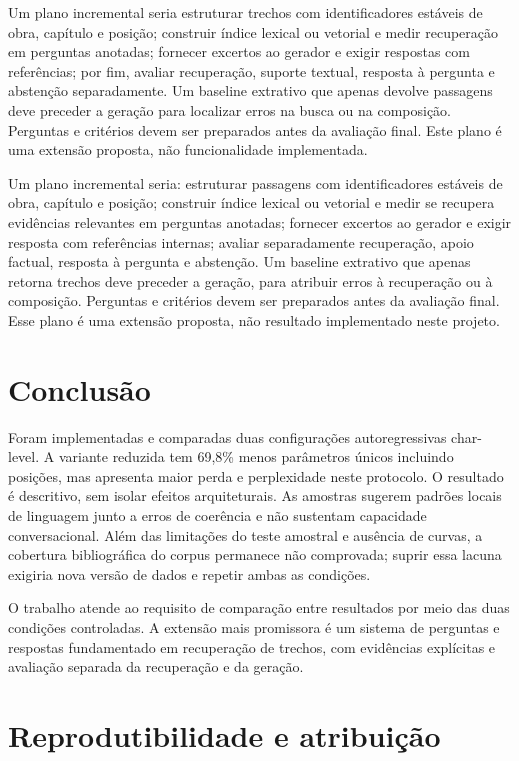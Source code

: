 \documentclass[conference]{IEEEtran}
\begin{document}
Um plano incremental seria estruturar trechos com identificadores estáveis de obra, capítulo e posição; construir índice lexical ou vetorial e medir recuperação em perguntas anotadas; fornecer excertos ao gerador e exigir respostas com referências; por fim, avaliar recuperação, suporte textual, resposta à pergunta e abstenção separadamente. Um baseline extrativo que apenas devolve passagens deve preceder a geração para localizar erros na busca ou na composição. Perguntas e critérios devem ser preparados antes da avaliação final. Este plano é uma extensão proposta, não funcionalidade implementada.

Um plano incremental seria: estruturar passagens com identificadores estáveis de obra, capítulo e posição; construir índice lexical ou vetorial e medir se recupera evidências relevantes em perguntas anotadas; fornecer excertos ao gerador e exigir resposta com referências internas; avaliar separadamente recuperação, apoio factual, resposta à pergunta e abstenção. Um baseline extrativo que apenas retorna trechos deve preceder a geração, para atribuir erros à recuperação ou à composição. Perguntas e critérios devem ser preparados antes da avaliação final. Esse plano é uma extensão proposta, não resultado implementado neste projeto.

\section{Conclusão}

Foram implementadas e comparadas duas configurações autoregressivas char-level. A variante reduzida tem 69,8\% menos parâmetros únicos incluindo posições, mas apresenta maior perda e perplexidade neste protocolo. O resultado é descritivo, sem isolar efeitos arquiteturais. As amostras sugerem padrões locais de linguagem junto a erros de coerência e não sustentam capacidade conversacional. Além das limitações do teste amostral e ausência de curvas, a cobertura bibliográfica do corpus permanece não comprovada; suprir essa lacuna exigiria nova versão de dados e repetir ambas as condições.

O trabalho atende ao requisito de comparação entre resultados por meio das duas condições controladas. A extensão mais promissora é um sistema de perguntas e respostas fundamentado em recuperação de trechos, com evidências explícitas e avaliação separada da recuperação e da geração.

\section*{Reprodutibilidade e atribuição}
\end{document}
